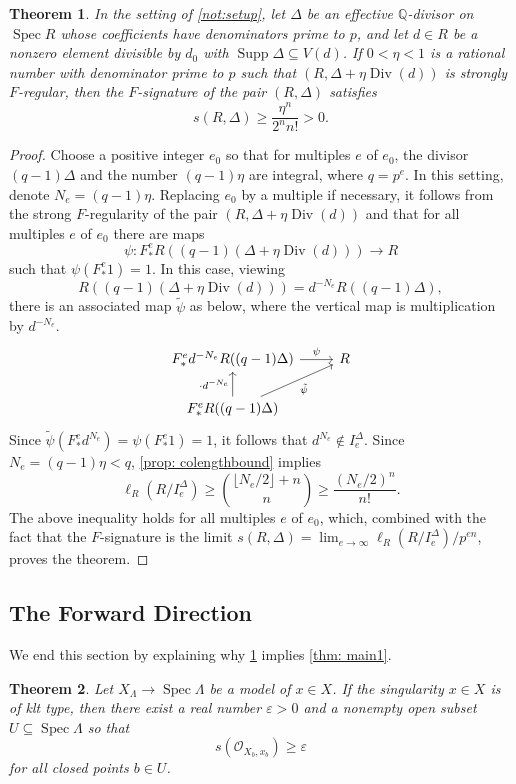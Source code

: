 \documentclass[11pt,leqno]{amsart}
\numberwithin{equation}{section}
\newtheorem{theorem}{Theorem}[section]
\theoremstyle{definition}
\theoremstyle{remark}
\renewcommand{\O}{\mathcal{O}}
\newcommand{\Q}{\mathbb{Q}}
\newcommand{\vare}{\varepsilon}
\newcommand{\Spec}{\operatorname{Spec}}
\newcommand{\lre}{\longrightarrow}
\newcommand{\Div}{\operatorname{Div}}
\newcommand{\Supp}{\operatorname{Supp}}
\begin{document}
\begin{theorem} \label{thm:charpmain}
In the setting of \cref{not:setup}, let $\Delta$ be an effective $\Q$-divisor on $\Spec R$ whose coefficients have denominators prime to $p$, and let $d \in R$ be a nonzero element divisible by $d_0$ with $\Supp \Delta \subseteq V(d)$. If $0< \eta < 1$ is a rational number with denominator prime to $p$ such that $(R, \Delta+ \eta \Div(d))$ is strongly $F$-regular, then the $F$-signature of the pair $(R, \Delta)$ satisfies $$s(R, \Delta) \geq \frac{\eta^n}{2^n n!} > 0.$$
\end{theorem}
\begin{proof}
Choose a positive integer $e_0$ so that for multiples $e$ of $e_0$, the divisor $(q - 1)\Delta$ and the number $(q - 1)\eta$ are integral, where $q = p^e$. In this setting, denote $N_e = (q - 1)\eta$. Replacing $e_0$ by a multiple if necessary, it follows from the strong $F$-regularity of the pair $(R, \Delta+ \eta \Div(d))$ and \cite[Chapter 5, Exercise 3.3]{SSbook} that for all multiples $e$ of $e_0$ there are maps $$\psi: F^e_* R((q - 1)(\Delta+ \eta \Div(d))) \lre R$$ such that $\psi(F^e_*1) = 1$. In this case, viewing $$R((q - 1)(\Delta+ \eta \Div(d))) = d^{-N_e}R((q - 1)\Delta),$$ there is an associated map $\tilde{\psi}$ as below, where the vertical map is multiplication by $d^{-N_e}$.
$$\begin{tikzcd}
F^e_*d^{-N_e}R((q - 1)\Delta) \arrow[r, "\psi"]                      & R \\
F^e_* R((q - 1)\Delta) \arrow[u, "\cdot d^{-N_e}"] \arrow[ru, "\tilde{\psi}"'] &
\end{tikzcd}$$
Since $\tilde{\psi}(F^e_*d^{N_e}) = \psi(F^e_*1) = 1$, it follows that $d^{N_e} \notin I_e^{\Delta}$. Since $N_e = (q - 1)\eta < q$, \cref{prop: colengthbound} implies
$$\ell_R(R/I^\Delta_e) \geq \binom{\lfloor N_e/2 \rfloor + n}{n} \geq \frac{(N_e/2)^n}{n!}.$$
The above inequality holds for all multiples $e$ of $e_0$, which, combined with the fact \cite[Theorem 3.11]{bst12} that the $F$-signature is the limit $s(R, \Delta) = \lim_{e \to \infty} \ell_R(R/I^\Delta_e)/p^{en}$, proves the theorem.
\end{proof}


\subsection*{The Forward Direction} We end this section by explaining why \cref{thm:charpmain} implies \cref{thm: main1}.

\begin{theorem} \label{thm: forwardirection} Let $X_\Lambda \to \Spec \Lambda$ be a model of $x \in X$. If the singularity $x \in X$ is of klt type, then there exist a real number $\vare > 0$ and a nonempty open subset $U \subseteq \Spec \Lambda$ so that $$s(\O_{X_b, x_b}) \geq \vare$$ for all closed points $b \in U$.\end{theorem}
\end{document}
